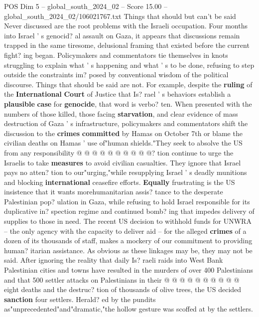 \begin{textsample}{POS Dim 5 – global\_south\_2024\_02 – Score 15.00 – global\_south\_2024\_02/106021767.txt}  \label{ex:f5_pos_193}
Things that should but can't be said Never discussed are the root problems with the Israeli occupation.
Four months into Israel ' s genocid? al assault on Gaza, it appears that discussions remain trapped in the same tiresome, delusional framing that existed before the current fight? ing began.
Policymakers and commentators tie themselves in knots struggling to explain what ' s happening and what ' s to be done, refusing to step outside the constraints im? posed by conventional wisdom of the political discourse.
Things that should be said are not.
For example, despite the \textbf{ruling} of the \textbf{International} \textbf{Court} of Justice that Is? rael ' s behaviors establish a \textbf{plausible} \textbf{case} for \textbf{genocide}, that word is verbo? ten.
When presented with the numbers of those killed, those facing \textbf{starvation}, and clear evidence of mass destruction of Gaza ' s infrastructure, policymakers and commentators shift the discussion to the \textbf{crimes} \textbf{committed} by Hamas on October 7th or blame the civilian deaths on Hamas ' use of"human shields."They seek to absolve the US from any responsibility @ @ @ @ @ @ @ @ @ @? tion continue to urge the Israelis to take \textbf{measures} to avoid civilian casualties.
They ignore that Israel pays no atten? tion to our"urging,"while resupplying Israel ' s deadly munitions and blocking \textbf{international} ceasefire efforts. \textbf{Equally} frustrating is the US insistence that it wants morehumanitarian assis? tance to the desperate Palestinian pop? ulation in Gaza, while refusing to hold Israel responsible for its duplicative in? spection regime and continued bomb? ing that impedes delivery of supplies to those in need.
The recent US decision to withhold funds for UNWRA -- the only agency with the capacity to deliver aid -- for the alleged \textbf{crimes} of a dozen of its thousands of staff, makes a mockery of our commitment to providing human? itarian assistance.
As obvious as these linkages may be, they may not be said.
After ignoring the reality that daily Is? raeli raids into West Bank Palestinian cities and towns have resulted in the murders of over 400 Palestinians and that 500 settler attacks on Palestinians in their @ @ @ @ @ @ @ @ @ @ eight deaths and the destruc? tion of thousands of olive trees, the US decided \textbf{sanction} four settlers.
Herald? ed by the pundits as"unprecedented"and"dramatic,"the hollow gesture was scoffed at by the settlers.

\end{textsample}
